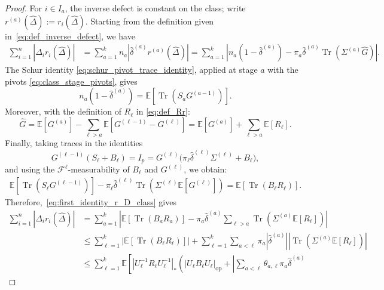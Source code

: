\documentclass[EJP, preprint, NODS, nobera, nofontexpansion]{ejpecp}
\DeclareMathOperator{\op}{op}
\DeclareMathOperator{\tr}{Tr}
\begin{document}
\begin{proof}
For $i\in I_a$, the inverse defect is constant on the class; write
$r^{(a)}(\widehat\Delta):=r_i(\widehat\Delta)$.
Starting from the definition given in~\eqref{eq:def_inverse_defect},
we have
\begin{align}\label{eq:first_identity_r_D_class}
    \sum_{i=1}^n|\widehat\Delta_i r_i(\widehat\Delta)|
    &=\sum_{a=1}^k n_a
        |\widehat\delta^{(a)}r^{(a)}(\widehat\Delta)|
    =\sum_{a=1}^k
        \left|
            n_a(1-\widehat\delta^{(a)})
            -\pi_a\widehat\delta^{(a)}
                \tr(\Sigma^{(a)}\widehat G)
        \right|.
\end{align}
The Schur identity \eqref{eq:schur_pivot_trace_identity}, applied
at stage $a$ with the pivots \eqref{eq:class_stage_pivots}, gives
\[
    n_a(1-\widehat\delta^{(a)})
    =\mathbb E[\tr(S_aG^{(a-1)})].
\]
Moreover, with the definition of $R_{\ell}$ in \eqref{eq:def_Rr}:
\[
    \widehat G
    =\mathbb E[G^{(a)}] - \sum_{\ell>a}\mathbb E[G^{(\ell-1)}-G^{(\ell)}]
    =\mathbb E[G^{(a)}] + \sum_{\ell>a}\mathbb E[R_{\ell}].
\]
Finally, taking traces in the identities
\[
    G^{(\ell-1)}(S_{\ell}+B_{\ell})=I_p
    =G^{(\ell)}
        \bigl(\pi_{\ell}\widehat\delta^{(\ell)}\Sigma^{(\ell)}+B_{\ell}\bigr),
\]
and using the $\mathcal F^{\ell}$-measurability of $B_{\ell}$ and $G^{(\ell)}$,
we obtain:
\begin{align*}
    \mathbb E[\tr(S_{\ell}G^{(\ell-1)})]
        -\pi_{\ell}\widehat\delta^{(\ell)}
            \tr\!\left(\Sigma^{(\ell)}\mathbb E[G^{(\ell)}]\right)
    = \mathbb E[\tr(B_{\ell}R_{\ell})].
\end{align*}
Therefore,~\eqref{eq:first_identity_r_D_class} gives
\begin{align*}
    \sum_{i=1}^n|\widehat\Delta_i r_i(\widehat\Delta)|
    &=\sum_{a=1}^k
        \left|
            \mathbb E[\tr(B_aR_a)]-\pi_a\widehat\delta^{(a)}
                \sum_{\ell>a}\tr(\Sigma^{(a)}\mathbb E[R_{\ell}])
        \right|\\
    &\leq
        \sum_{\ell=1}^k\left|\mathbb E[\tr(B_{\ell}R_{\ell})]\right|
        +\sum_{\ell=1}^k\sum_{a<\ell}
            \pi_a|\widehat\delta^{(a)}|
            |\tr(\Sigma^{(a)}\mathbb E[R_{\ell}])|\\
    &\leq \sum_{\ell=1}^k
        \mathbb E\!\left[
            \left|U_{\ell}^{-1}R_{\ell}U_{\ell}^{-1}\right|_*
            \left(
                |U_{\ell}B_{\ell}U_{\ell}|_{\op}
                +\left|\sum_{a<\ell}
                    \theta_{a,\ell}\pi_a\widehat\delta^{(a)}

\end{align*}
\end{proof}
\end{document}
